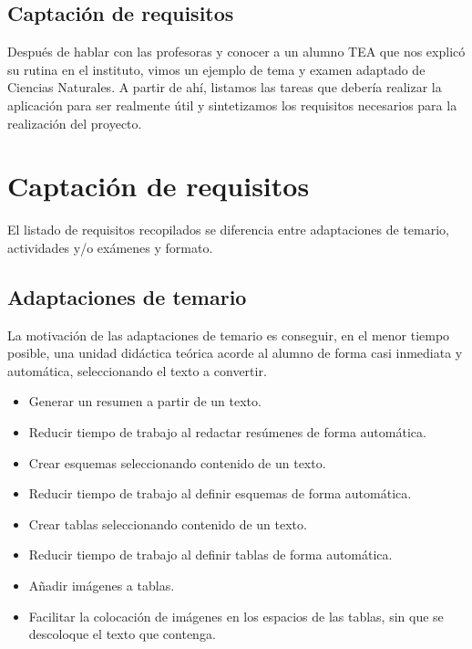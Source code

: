 \subsection{Captaci\'on de requisitos}

    Despu\'es de hablar con las profesoras y conocer a un alumno TEA que nos explic\'o su rutina en el instituto, vimos un ejemplo de tema y examen adaptado de Ciencias Naturales. A partir de ah\'i, listamos las tareas que deber\'ia realizar la aplicaci\'on para ser realmente \'util y sintetizamos los requisitos necesarios para la realizaci\'on del proyecto.

\section{Captaci\'on de requisitos}
\label{cap1:sec:capacionrequisitos}

	El listado de requisitos recopilados se diferencia entre adaptaciones de temario, actividades y/o ex\'amenes y formato.
	
\subsection{Adaptaciones de temario}

    La motivaci\'on de las adaptaciones de temario es conseguir, en el menor tiempo posible, una unidad did\'actica te\'orica acorde al alumno de forma casi inmediata y autom\'atica, seleccionando el texto a convertir.

\begin{itemize}
	\item Generar un resumen a partir de un texto.
	\item Reducir tiempo de trabajo al redactar res\'umenes de forma autom\'atica.
	\item Crear esquemas seleccionando contenido de un texto.
	\item Reducir tiempo de trabajo al definir esquemas de forma autom\'atica.
	\item Crear tablas seleccionando contenido de un texto.
	\item Reducir tiempo de trabajo al definir tablas de forma autom\'atica.
	\item A\~{n}adir im\'agenes a tablas.
	\item Facilitar la colocaci\'on de im\'agenes en los espacios de las tablas, sin que se descoloque el texto que contenga.
\end{itemize}

